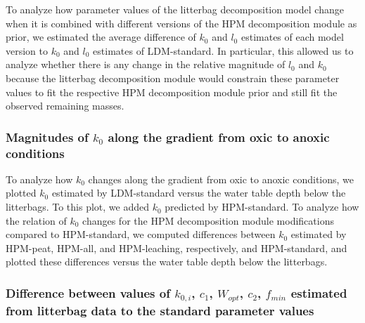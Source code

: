 \documentclass[esd, manuscript]{copernicus}
\begin{document}
To analyze how parameter values of the litterbag decomposition model change when it is combined with different versions of the HPM decomposition module as prior, we estimated the average difference of \(k_0\) and \(l_0\) estimates of each model version to \(k_0\) and \(l_0\) estimates of LDM-standard. In particular, this allowed us to analyze whether there is any change in the relative magnitude of \(l_0\) and \(k_0\) because the litterbag decomposition module would constrain these parameter values to fit the respective HPM decomposition module prior and still fit the observed remaining masses.

\subsubsection{\texorpdfstring{Magnitudes of \(k_0\) along the gradient from oxic to anoxic conditions}{Magnitudes of k\_0 along the gradient from oxic to anoxic conditions}}

To analyze how \(k_0\) changes along the gradient from oxic to anoxic conditions, we plotted \(k_0\) estimated by LDM-standard versus the water table depth below the litterbags. To this plot, we added \(k_0\) predicted by HPM-standard. To analyze how the relation of \(k_0\) changes for the HPM decomposition module modifications compared to HPM-standard, we computed differences between \(k_0\) estimated by HPM-peat, HPM-all, and HPM-leaching, respectively, and HPM-standard, and plotted these differences versus the water table depth below the litterbags.

\subsubsection{\texorpdfstring{Difference between values of \(k_{0,i}\), \(c_1\), \(W_{opt}\), \(c_2\), \(f_{min}\) estimated from litterbag data to the standard parameter values}{Difference between values of k\_\{0,i\}, c\_1, W\_\{opt\}, c\_2, f\_\{min\} estimated from litterbag data to the standard parameter values}}
\end{document}
